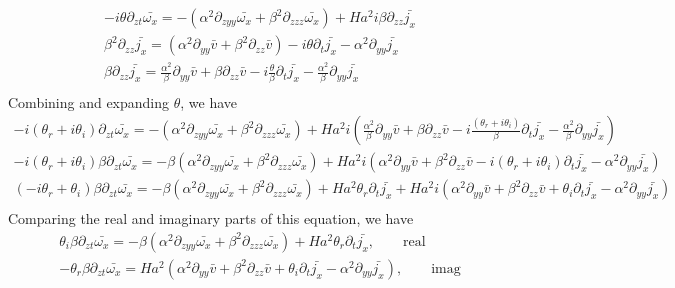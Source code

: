 \documentclass[11pt]{article}
\newcommand{\PD}{\partial}
\begin{document}
\begin{equation}\begin{aligned}
-i\theta \PD_{zt} \bar{\omega_x} = - (\alpha^2 \PD_{zyy} \bar{\omega_x} + \beta^2 \PD_{zzz} \bar{\omega_x}) + Ha^2 i \beta \PD_{zz} \bar{j_x} \\
\beta^2 \PD_{zz} \bar{j_x} = (\alpha^2 \PD_{yy} \bar{v} + \beta^2 \PD_{zz} \bar{v}) - i\theta \PD_t \bar{j_x} - \alpha^2 \PD_{yy} \bar{j_x} \\
\beta \PD_{zz} \bar{j_x} = \frac{\alpha^2}{\beta} \PD_{yy} \bar{v} + \beta \PD_{zz} \bar{v} - i \frac{\theta}{\beta} \PD_t \bar{j_x} - \frac{\alpha^2}{\beta} \PD_{yy} \bar{j_x} \\
\end{aligned}\end{equation}
Combining and expanding $\theta$, we have
\begin{equation}\begin{aligned}
-i(\theta_r + i\theta_i) \PD_{zt} \bar{\omega_x} = - (\alpha^2 \PD_{zyy} \bar{\omega_x} + \beta^2 \PD_{zzz} \bar{\omega_x}) + Ha^2 i \left( \frac{\alpha^2}{\beta} \PD_{yy} \bar{v} + \beta \PD_{zz} \bar{v} - i \frac{(\theta_r + i\theta_i)}{\beta} \PD_t \bar{j_x} - \frac{\alpha^2}{\beta} \PD_{yy} \bar{j_x} \right) \\
-i(\theta_r + i\theta_i) \beta \PD_{zt} \bar{\omega_x} = - \beta (\alpha^2 \PD_{zyy} \bar{\omega_x} + \beta^2 \PD_{zzz} \bar{\omega_x}) + Ha^2 i \left( \alpha^2 \PD_{yy} \bar{v} + \beta^2 \PD_{zz} \bar{v} - i (\theta_r + i\theta_i) \PD_t \bar{j_x} - \alpha^2 \PD_{yy} \bar{j_x} \right) \\
(-i\theta_r + \theta_i) \beta \PD_{zt} \bar{\omega_x} = - \beta (\alpha^2 \PD_{zyy} \bar{\omega_x} + \beta^2 \PD_{zzz} \bar{\omega_x}) + Ha^2 \theta_r \PD_t \bar{j_x} + Ha^2 i \left( \alpha^2 \PD_{yy} \bar{v} + \beta^2 \PD_{zz} \bar{v} + \theta_i \PD_t \bar{j_x} - \alpha^2 \PD_{yy} \bar{j_x} \right) \\
\end{aligned}\end{equation}
Comparing the real and imaginary parts of this equation, we have
\begin{equation}\begin{aligned}
 \theta_i \beta \PD_{zt} \bar{\omega_x} = - \beta (\alpha^2 \PD_{zyy} \bar{\omega_x} + \beta^2 \PD_{zzz} \bar{\omega_x}) + Ha^2 \theta_r \PD_t \bar{j_x}, \qquad \text{real} \\
-\theta_r \beta \PD_{zt} \bar{\omega_x} = Ha^2 \left( \alpha^2 \PD_{yy} \bar{v} + \beta^2 \PD_{zz} \bar{v} + \theta_i \PD_t \bar{j_x} - \alpha^2 \PD_{yy} \bar{j_x} \right), \qquad \text{imag} \\
\end{aligned}\end{equation}
\end{document}
